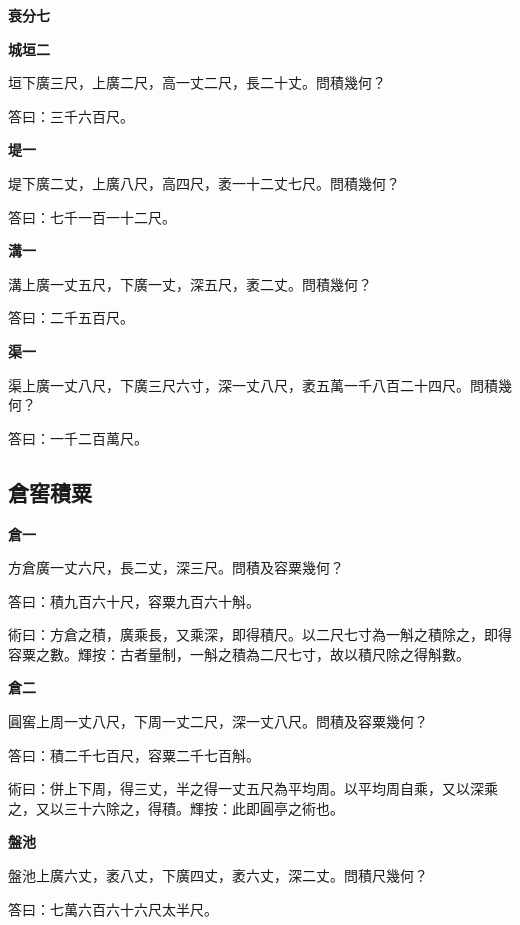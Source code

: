 \documentclass[11pt,a4paper]{article}
\newenvironment{problemenv}[1]{%
  \medskip\noindent\textbf{#1}\par\nopagebreak\smallskip
}{\medskip}
\begin{document}
\begin{problemenv}{衰分七}
\begin{problemenv}{城垣二}
垣下廣三尺，上廣二尺，高一丈二尺，長二十丈。問積幾何？

\textsf{答曰：}三千六百尺。
\end{problemenv}

\begin{problemenv}{堤一}
堤下廣二丈，上廣八尺，高四尺，袤一十二丈七尺。問積幾何？

\textsf{答曰：}七千一百一十二尺。
\end{problemenv}

\begin{problemenv}{溝一}
溝上廣一丈五尺，下廣一丈，深五尺，袤二丈。問積幾何？

\textsf{答曰：}二千五百尺。
\end{problemenv}

\begin{problemenv}{渠一}
渠上廣一丈八尺，下廣三尺六寸，深一丈八尺，袤五萬一千八百二十四尺。問積幾何？

\textsf{答曰：}一千二百萬尺。
\end{problemenv}

\subsection{倉窖積粟}

\begin{problemenv}{倉一}
方倉廣一丈六尺，長二丈，深三尺。問積及容粟幾何？

\textsf{答曰：}積九百六十尺，容粟九百六十斛。

\textsf{術曰：}方倉之積，廣乘長，又乘深，即得積尺。以二尺七寸為一斛之積除之，即得容粟之數。輝按：古者量制，一斛之積為二尺七寸，故以積尺除之得斛數。
\end{problemenv}

\begin{problemenv}{倉二}
圓窖上周一丈八尺，下周一丈二尺，深一丈八尺。問積及容粟幾何？

\textsf{答曰：}積二千七百尺，容粟二千七百斛。

\textsf{術曰：}併上下周，得三丈，半之得一丈五尺為平均周。以平均周自乘，又以深乘之，又以三十六除之，得積。輝按：此即圓亭之術也。
\end{problemenv}

\begin{problemenv}{盤池}
盤池上廣六丈，袤八丈，下廣四丈，袤六丈，深二丈。問積尺幾何？

\textsf{答曰：}七萬六百六十六尺太半尺。


\end{problemenv}
\end{problemenv}
\end{document}
